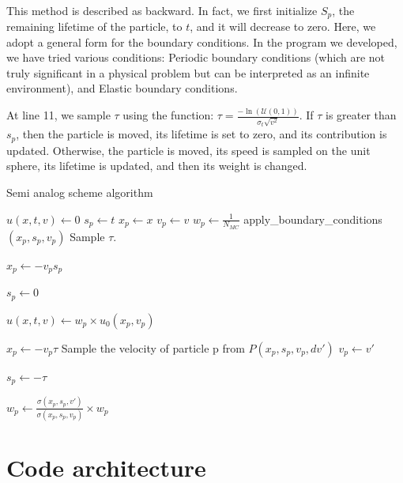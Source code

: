 \documentclass[a4paper, 11pt]{article}
\begin{document}
\paragraph{}
This method is described as backward. In fact, we first initialize $S_p$, the remaining lifetime of the particle, to $t$, and it will decrease to zero. Here, we adopt a general form for the boundary conditions. In the program we developed, we have tried various conditions: Periodic boundary conditions (which are not truly significant in a physical problem but can be interpreted as an infinite environment), and Elastic boundary conditions.

At line 11, we sample $\tau$ using the function: $\tau = \frac{-\ln(\mathcal{U}(0,1))}{\sigma_t \sqrt{v^2}}$. If $\tau$ is greater than $s_p$, then the particle is moved, its lifetime is set to zero, and its contribution is updated. Otherwise, the particle is moved, its speed is sampled on the unit sphere, its lifetime is updated, and then its weight is changed.






\begin{algorithm}
	\caption{Semi analog scheme algorithm}
	\begin{algorithmic}[1]
		\State $u(x, t, v) \gets 0$
		\State $s_p \gets t$ 
		\State $x_p \gets x$
		\State $v_p \gets v$
		\State $w_p \gets \frac{1}{N_{MC}}$
		\State apply\_boundary\_conditions$(x_p, s_p, v_p)$
		\EndIf
		\State Sample $\tau$.



		\State $x_p \gets - v_p s_p$

		\State $s_p \gets 0$

		\State $u(x, t, v) \gets w_p \times u_0(x_p, v_p)$
		\Else

		\State $x_p \gets - v_p \tau$
		\State Sample the velocity of particle p from $P(x_p, s_p, v_p, dv')$
		\State $v_p \gets v'$

		\State $s_p \gets - \tau$

		\State $w_p \gets \frac{\sigma(x_p, s_p, v')}{\sigma(x_p, s_p, v_p)} \times w_p$
		\EndIf
		\EndWhile
		\EndFor
	\end{algorithmic}
\end{algorithm}






\section{Code architecture}
\end{document}
